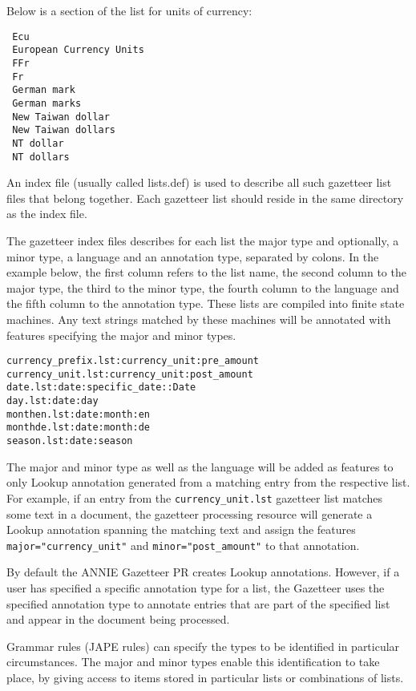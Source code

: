 Below is a section of the list for units of currency: 
\begin{small}\begin{verbatim}
 Ecu  
 European Currency Units  
 FFr  
 Fr  
 German mark  
 German marks  
 New Taiwan dollar  
 New Taiwan dollars  
 NT dollar  
 NT dollars 
\end{verbatim}\end{small}

An index file (usually called lists.def) is used to describe all such 
gazetteer list files that belong together. 
Each gazetteer list should reside in the same directory as the
index file. 

The gazetteer index files describes for each list the major type
and optionally, a minor type, a language and an annotation type, 
separated by colons.  In the example below, the first column refers to
the list name, the second column to the major type, the third to the
minor type, the fourth column to the language and the fifth column
to the annotation type. These lists are compiled into finite state 
machines. Any text strings matched by these machines will be 
annotated with features specifying the major and minor types. 

\begin{small}\begin{verbatim}
currency_prefix.lst:currency_unit:pre_amount
currency_unit.lst:currency_unit:post_amount 
date.lst:date:specific_date::Date
day.lst:date:day
monthen.lst:date:month:en
monthde.lst:date:month:de
season.lst:date:season
\end{verbatim}\end{small}

The major and minor type as well as the language will be added as 
features to only Lookup annotation generated from a matching entry from
the respective list. For example, if an entry from the \texttt{currency\_unit.lst}
gazetteer list matches some text in a document, the gazetteer processing
resource will generate a Lookup annotation spanning the matching text
and assign the features \texttt{major="currency\_unit"} and 
\texttt{minor="post\_amount"} to that annotation.

By default the ANNIE Gazetteer PR creates Lookup annotations.  However,
if a user has specified a specific annotation type for a list, the Gazetteer uses
the specified annotation type to annotate entries that are part of the specified
list and appear in the document being processed. 

Grammar rules (JAPE rules) can specify the types to be identified in particular
circumstances. The major and minor types enable this identification to
take place, by giving access to items stored in particular lists or
combinations of lists.

